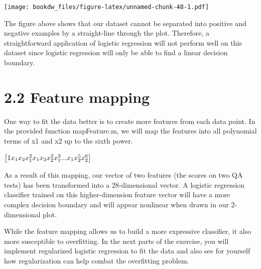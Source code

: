 \documentclass[
]{book}
\begin{document}
\texttt{[image: bookdw\_files/figure-latex/unnamed-chunk-48-1.pdf]}

The figure above shows that our dataset cannot be separated into positive and negative examples by a straight-line through the plot. Therefore, a straightforward application of logistic regression will not perform well on this dataset since logistic regression will only be able to find a linear decision boundary.

\hypertarget{feature-mapping}{%
\section{2.2 Feature mapping}\label{feature-mapping}}

One way to fit the data better is to create more features from each data point. In the provided function mapFeature.m, we will map the features into all polynomial terms of x1 and x2 up to the sixth power.

\(\begin{bmatrix} 1 \newline x_1 \newline x_2 \newline x_1^{2} \newline x_1 x_2 \newline x_2^{2} \newline x_1^{3} \newline . \newline . \newline . \newline x_1 x_2^{5} \newline x_2^{6} \end{bmatrix}\)

As a result of this mapping, our vector of two features (the scores on two QA tests) has been transformed into a 28-dimensional vector. A logistic regression classifier trained on this higher-dimension feature vector will have a more complex decision boundary and will appear nonlinear when drawn in our 2-dimensional plot.

While the feature mapping allows us to build a more expressive classifier, it also more susceptible to overfitting. In the next parts of the exercise, you will implement regularized logistic regression to fit the data and also see for yourself how regularization can help combat the overfitting problem.
\end{document}
